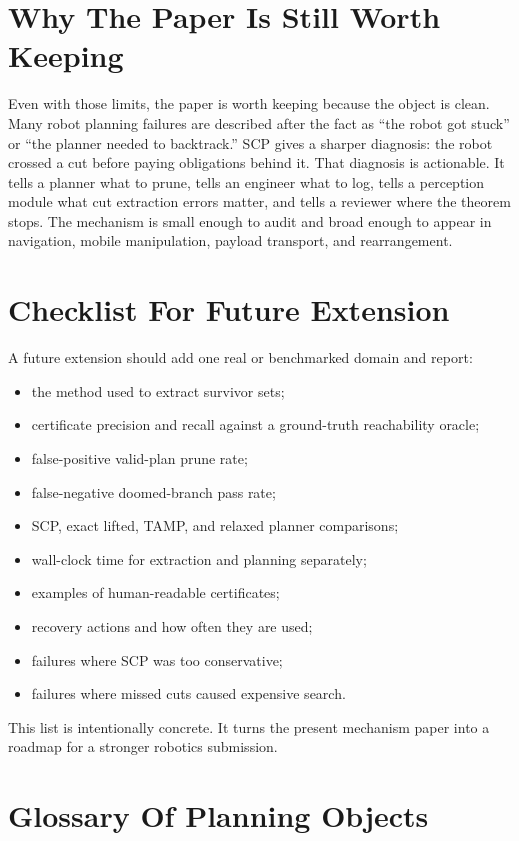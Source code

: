 \documentclass{article}
\begin{document}
\section{Why The Paper Is Still Worth Keeping}

Even with those limits, the paper is worth keeping because the object is clean. Many robot planning failures are described after the fact as ``the robot got stuck'' or ``the planner needed to backtrack.'' SCP gives a sharper diagnosis: the robot crossed a cut before paying obligations behind it. That diagnosis is actionable. It tells a planner what to prune, tells an engineer what to log, tells a perception module what cut extraction errors matter, and tells a reviewer where the theorem stops. The mechanism is small enough to audit and broad enough to appear in navigation, mobile manipulation, payload transport, and rearrangement.

\section{Checklist For Future Extension}

A future extension should add one real or benchmarked domain and report:
\begin{itemize}
  \item the method used to extract survivor sets;
  \item certificate precision and recall against a ground-truth reachability oracle;
  \item false-positive valid-plan prune rate;
  \item false-negative doomed-branch pass rate;
  \item SCP, exact lifted, TAMP, and relaxed planner comparisons;
  \item wall-clock time for extraction and planning separately;
  \item examples of human-readable certificates;
  \item recovery actions and how often they are used;
  \item failures where SCP was too conservative;
  \item failures where missed cuts caused expensive search.
\end{itemize}
This list is intentionally concrete. It turns the present mechanism paper into a roadmap for a stronger robotics submission.

\section{Glossary Of Planning Objects}
\end{document}
